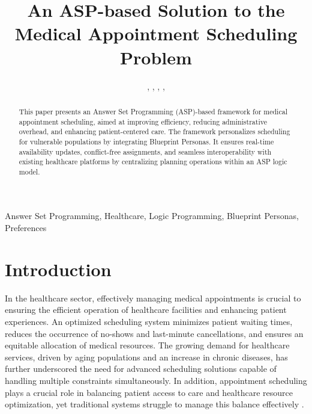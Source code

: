 \documentclass{tlp}
\begin{document}

\title[An ASP-based Solution to the Medical Appointment Scheduling Problem]{An ASP-based Solution to the Medical Appointment Scheduling Problem}

\begin{authgrp}
\author{ , 
 ,  ,  ,  }

\end{authgrp}



\maketitle

\begin{abstract}
This paper presents an Answer Set Programming (ASP)-based framework for medical appointment scheduling, aimed at improving efficiency, reducing administrative overhead, and enhancing patient-centered care. The framework personalizes scheduling for vulnerable populations by integrating Blueprint Personas. It ensures real-time availability updates, conflict-free assignments, and seamless interoperability with existing healthcare platforms by centralizing planning operations within an ASP logic model.

\end{abstract}

\begin{keywords}
Answer Set Programming, Healthcare, Logic Programming, Blueprint Personas, Preferences
\end{keywords}


\section{Introduction}
\label{introduction}

In the healthcare sector, effectively managing medical appointments is crucial to ensuring the efficient operation of healthcare facilities and enhancing patient experiences. An optimized scheduling system minimizes patient waiting times, reduces the occurrence of no-shows and last-minute cancellations, and ensures an equitable allocation of medical resources. The growing demand for healthcare services, driven by aging populations and an increase in chronic diseases, has further underscored the need for advanced scheduling solutions capable of handling multiple constraints simultaneously. In addition, appointment scheduling plays a crucial role in balancing patient access to care and healthcare resource optimization, yet traditional systems struggle to manage this balance effectively \citep{gupta2008appointment}.
\end{document}
